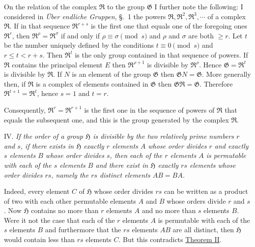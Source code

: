 \documentclass[a5paper,12pt]{article}
\newcommand{\secformat}[1]{\centering{\normalfont\normalsize{#1}}}
\let\fr\mathfrak
\newcommand{\CG}{\fr{G}}
\newcommand{\CH}{\fr{H}}
\newcommand{\CR}{\fr{R}}
\newcommand{\?}{{\color{blue}${}^{(?)}$}}
\newcounter{origpagecounter}{}
\newcommand{\origpagebreak}{\mark{\arabic{origpagecounter}}\addtocounter{origpagecounter}{1}\mark{\arabic{origpagecounter}}}
\begin{document}

On the relation of the complex $\CR$ to the group $\CG$
I further note the following:
%
%
I considered
in \emph{\"Uber endliche Gruppen}, \S.~1
the powers $\CR, \CR^2, \CR^3, \cdots$ of a complex $\CR$.
%
%
If in that sequence
$\CR^{r + s}$
is the first one
that equals one of the foregoing ones $\CR^r$,
then
$\CR^\rho = \CR^\sigma$
if and only if
$\rho \equiv \sigma \pmod{s}$
and
$\rho$ and $\sigma$ are both $\geq r$.
%
%
Let $t$ be the number uniquely defined by
the conditions
$t \equiv 0 \pmod{s}$
and
$r \leq t < r + s$.
%
%
Then $\CR^t$ is the only group contained in that sequence
of powers.
%
%
If $\CR$ contains the principal element $E$
then $\CR^{\rho + 1}$ is divisible by $\CR^\rho$.
%
%
Hence $\CG = \CR^t$ is divisible by $\CR$.
%
%
If $N$ is an element of the group $\CG$
then $\CG N = \CG$.
%
%
More generally then,
if $\CR$
is a complex of elements
contained in $\CG$
then $\CG \CR = \CG$.
%
%
Therefore $\CR^{t+1} = \CR^t$,
hence $s = 1$ and $t = r$.
%
%
\origpagebreak
%
%
Consequently,
$\CR^r = \CR^{r+1}$
is the first one
in the sequence of powers of $\CR$
that equals the subsequent one,
and this is the group generated by the complex $\CR$.


IV.
%
\label{t:2-4}
%
\emph{ %
If the order of a group $\CH$
is
divisible by the two relatively prime numbers $r$ and $s$,
if
there exists in $\CH$
exactly $r$ elements $A$
whose order divides $r$
and
exactly $s$ elements $B$
whose order divides $s$,
then
each of the $r$ elements $A$
is permutable
with each of the $s$ elements $B$
and
there exist in $\CH$ exactly $r s$ elements
whose order divides $r s$,
namely the $r s$ distinct elements $A B = B A$.
}


Indeed,
every element $C$ of $\CH$
whose order divides $r s$
can be written as a product of
two with each other permutable elements $A$ and $B$
whose orders divide $r$ and $s$.
%
%
Now
$\CH$ contains
no more than $r$ elements $A$
and
no more than $s$ elements $B$.
%
%
Were it not the case
that
each of the $r$ elements $A$
is permutable with
each of the $s$ elements $B$
and
furthermore
that
the $r s$ elements $A B$ are all distinct,
then
$\CH$ would contain less than $r s$ elements $C$.
%
%
But this contradicts
\hyperref[t:2-2]{Theorem II}.


\subsubsection*{\secformat{\S.~3.}}
\end{document}
